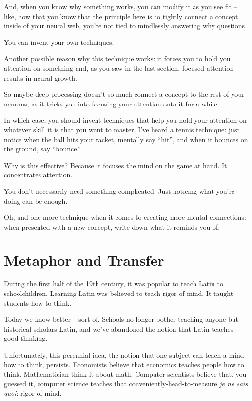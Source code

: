And, when you know why something works, you can modify it as you see fit --
like, now that you know that the principle here is to tightly connect a concept
inside of your neural web, you're not tied to mindlessly answering why
questions.

You can invent your own techniques.

Another possible reason why this technique works: it forces you to hold you
attention on something and, as you saw in the last section, focused attention
results in neural growth.

So maybe deep processing doesn't so much connect a concept to the rest of your
neurons, as it tricks you into focusing your attention onto it for a while.

In which case, you should invent techniques that help you hold your attention on
whatever skill it is that you want to master. I've heard a tennis technique:
just notice when the ball hits your racket, mentally say ``hit'', and when it
bounces on the ground, say ``bounce.''

Why is this effective? Because it focuses the mind on the game at hand. It
concentrates attention.

You don't necessarily need something complicated. Just noticing what you're
doing can be enough.

Oh, and one more technique when it comes to creating more mental connections:
when presented with a new concept, write down what it reminds you of. 

\section{Metaphor and Transfer}

During the first half of the 19th century, it was popular to teach Latin to
schoolchildren. Learning Latin was believed to teach rigor of mind. It taught
students how to think.

Today we know better -- sort of. Schools no longer bother teaching anyone but
historical scholars Latin, and we've abandoned the notion that Latin teaches
good thinking.

Unfortunately, this perennial idea, the notion that one subject can teach a mind
how to think, persists. Economists believe that economics teaches people how to
think. Mathematician think it about math. Computer scientists believe that, you
guessed it, computer science teaches that conveniently-head-to-measure
\textit{je ne sais quoi}: rigor of mind.

